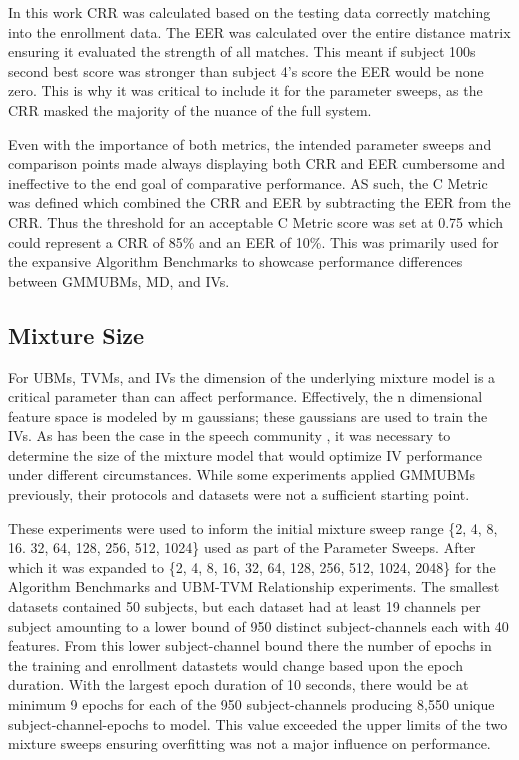 In this work \ac{CRR} was calculated based on the testing data correctly matching into the enrollment data. The \ac{EER} was calculated over the entire distance matrix ensuring it evaluated the strength of all matches. This meant if subject 100s second best score was stronger than subject 4's score the \ac{EER} would be none zero. This is why it was critical to include it for the parameter sweeps, as the \ac{CRR} masked the majority of the nuance of the full system.

Even with the importance of both metrics, the intended parameter sweeps and comparison points made always displaying both \ac{CRR} and \ac{EER} cumbersome and ineffective to the end goal of comparative performance. AS such, the C Metric was defined which combined the \ac{CRR} and \ac{EER} by subtracting the \ac{EER} from the \ac{CRR}. Thus the threshold for an acceptable C Metric score was set at 0.75 which could represent a \ac{CRR} of 85\% and an \ac{EER} of 10\%. This was primarily used for the expansive Algorithm Benchmarks to showcase performance differences between \acp{GMMUBM}, \ac{MD}, and \acp{IV}.

\subsection{Mixture Size}

For \acp{UBM}, \acp{TVM}, and \acp{IV} the dimension of the underlying mixture model is a critical parameter than can affect performance. Effectively, the n dimensional feature space is modeled by m gaussians; these gaussians are used to train the \acp{IV}. As has been the case in the speech community \cite{Bahari2012, Glembek2011, Behravan2013}, it was necessary to determine the size of the mixture model that would optimize \ac{IV} performance under different circumstances. While some experiments applied \acp{GMMUBM} previously, their protocols and datasets were not a sufficient starting point\cite{Marcano2018, Nguyen2013}.

These experiments were used to inform the initial mixture sweep range \{2, 4, 8, 16. 32, 64, 128, 256, 512, 1024\} used as part of the Parameter Sweeps. After which it was expanded to \{2, 4, 8, 16, 32, 64, 128, 256, 512, 1024, 2048\} for the Algorithm Benchmarks and \ac{UBM}-\ac{TVM} Relationship experiments. The smallest datasets contained 50 subjects, but each dataset had at least 19 channels per subject amounting to a lower bound of 950 distinct subject-channels each with 40 features. From this lower subject-channel bound there the number of epochs in the training and enrollment datastets would change based upon the epoch duration. With the largest epoch duration of 10 seconds, there would be at minimum 9 epochs for each of the 950 subject-channels producing 8,550 unique subject-channel-epochs to model. This value exceeded the upper limits of the two mixture sweeps ensuring overfitting was not a major influence on performance.

